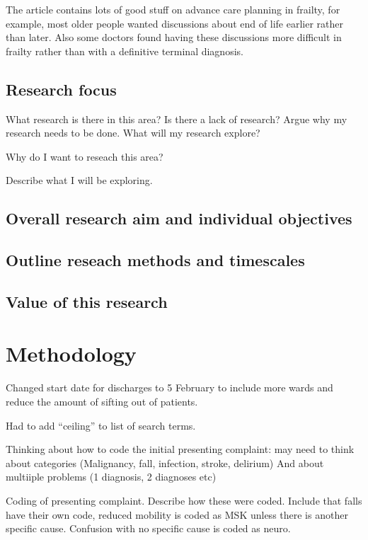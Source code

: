 \documentclass
[
	12pt,
	a4paper,
	oneside,
]{report}
\begin{document}
The article \textcite{sharp:13} contains lots of good
stuff on advance care planning in frailty, for example, most older people wanted
discussions about end of life earlier rather than later. Also some doctors found
having these discussions  more difficult in frailty rather than with a 
definitive terminal diagnosis.

\section{Research focus}
What research is there in this area? 
Is there a lack of research? 
Argue why my research needs to be done.
What will my research explore? 

Why do I want to reseach this area?

Describe what I will be exploring.

\section{Overall research aim and individual objectives}

\section{Outline reseach methods and timescales}

\section{Value of this research}


\chapter{Methodology}
 
Changed start date for discharges to 5 February to include more wards and reduce
the amount of sifting out of patients.

Had to add ``ceiling'' to list of search terms.

Thinking about how to code the initial presenting complaint: may need to think about
categories (Malignancy, fall, infection, stroke, delirium) And about multiiple problems
(1 diagnosis, 2 diagnoses etc)

Coding of presenting complaint. Describe how these were coded. Include that falls
have their own code, reduced mobility is coded as MSK unless there is another specific
cause. Confusion with no specific cause is coded as neuro.
\end{document}
